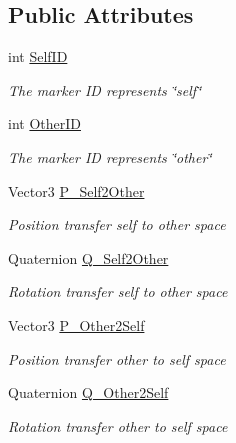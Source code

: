 \subsection*{Public Attributes}
\begin{DoxyCompactItemize}
\item 
int \mbox{\hyperlink{class_ximmerse_1_1_rhino_x_1_1_calibration_serialization_data_a40dcec53e2ae1967cf4ef5aedff63c92}{Self\+ID}}
\begin{DoxyCompactList}\small\item\em The marker ID represents \char`\"{}self\char`\"{} \end{DoxyCompactList}\item 
int \mbox{\hyperlink{class_ximmerse_1_1_rhino_x_1_1_calibration_serialization_data_acc2ded62f0e4db7e4284f11494babd5b}{Other\+ID}}
\begin{DoxyCompactList}\small\item\em The marker ID represents \char`\"{}other\char`\"{} \end{DoxyCompactList}\item 
Vector3 \mbox{\hyperlink{class_ximmerse_1_1_rhino_x_1_1_calibration_serialization_data_a8919018eed725bf6c85ed9b1b32d4bdf}{P\+\_\+\+Self2\+Other}}
\begin{DoxyCompactList}\small\item\em Position transfer self to other space \end{DoxyCompactList}\item 
Quaternion \mbox{\hyperlink{class_ximmerse_1_1_rhino_x_1_1_calibration_serialization_data_addd1ca5772b4c8fb9408383c5b7f6d99}{Q\+\_\+\+Self2\+Other}}
\begin{DoxyCompactList}\small\item\em Rotation transfer self to other space \end{DoxyCompactList}\item 
Vector3 \mbox{\hyperlink{class_ximmerse_1_1_rhino_x_1_1_calibration_serialization_data_a7d0239f8ee5618360d38e600ed4a4b2e}{P\+\_\+\+Other2\+Self}}
\begin{DoxyCompactList}\small\item\em Position transfer other to self space \end{DoxyCompactList}\item 
Quaternion \mbox{\hyperlink{class_ximmerse_1_1_rhino_x_1_1_calibration_serialization_data_a3988b74a9fe9394d03197c6e386ccfb6}{Q\+\_\+\+Other2\+Self}}
\begin{DoxyCompactList}\small\item\em Rotation transfer other to self space \end{DoxyCompactList}\end{DoxyCompactItemize}
